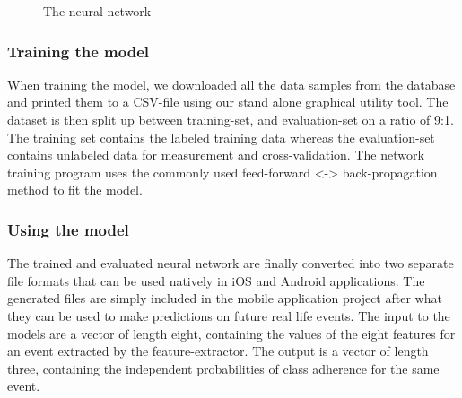 \documentclass[12pt, a4paper, onecolumn]{article}
\begin{document}
	\begin{figure}[H]
		\centering
		\caption{The neural network}%
		\label{fig:neural-network}%
	\end{figure}
	
	\subsubsection{Training the model}
	When training the model, we downloaded all the data samples from the database and printed them to a CSV-file using our stand alone graphical utility tool. The dataset is then split up between training-set, and evaluation-set on a ratio of 9:1. The training set contains the labeled training data whereas the evaluation-set contains unlabeled data for measurement and cross-validation. The network training program uses the commonly used feed-forward <-> back-propagation method \cite{neural_networks} to fit the model. 
	
	
	\subsubsection{Using the model}
	The trained and evaluated neural network are finally converted into two separate file formats that can be used natively in iOS and Android applications. The generated files are simply included in the mobile application project after what they can be used to make predictions on future real life events. The input to the models are a vector of length eight, containing the values of the eight features for an event extracted by the feature-extractor. The output is a vector of length three, containing the independent probabilities of class adherence for the same event. 
	
\end{document}
